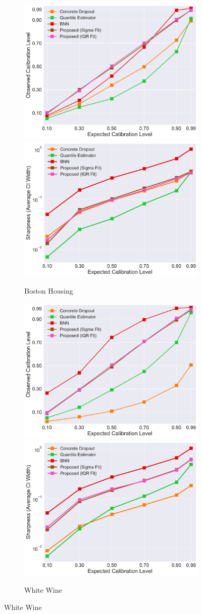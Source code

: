 \documentclass[letterpaper]{article} %
\begin{document}
\begin{figure}[t]
	\centering
	\begin{subfigure}[b]{0.48\textwidth}
	        \centering
			\includegraphics[width=0.48\linewidth, keepaspectratio=true]{boston.pdf}
			\includegraphics[width=0.48\linewidth, keepaspectratio=true]{boston-cvsws.pdf}
		\caption{Boston Housing}
	    \label{fig:boston}		
    \end{subfigure}
    \begin{subfigure}[b]{0.48\textwidth}
	        \centering
			\includegraphics[width=0.48\linewidth, keepaspectratio=true]{whitewine.pdf}
			\includegraphics[width=0.48\linewidth, keepaspectratio=true]{whitewine-cvsws.pdf}
		\caption{White Wine}
	    \label{fig:whitewine}		
    \end{subfigure}
    

\end{figure}
\end{document}
